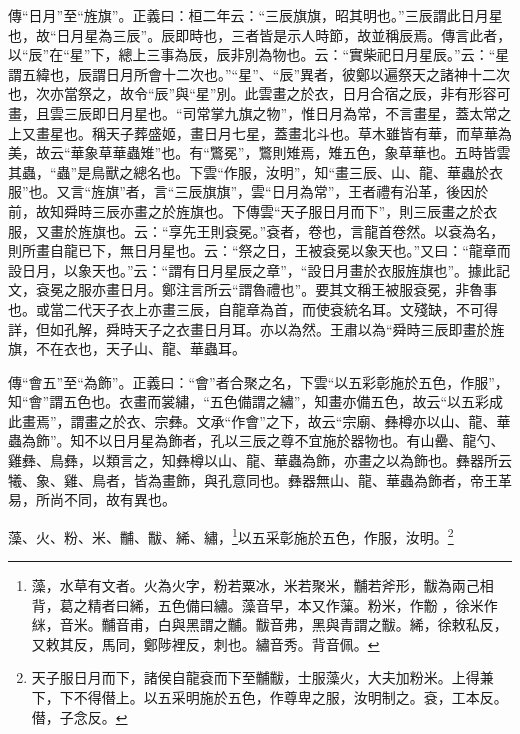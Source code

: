 {\noindent\zhuan{}\fzbyks 傳“日月”至“旌旗”。正義曰：桓二年云：“三辰旗旗，昭其明也。”三辰謂此日月星也，故“日月星為三辰”。辰即時也，三者皆是示人時節，故並稱辰焉。傳言此者，以“辰”在“星”下，總上三事為辰，辰非別為物也。云：“實柴祀日月星辰。”云：“星謂五緯也，辰謂日月所會十二次也。”“星”、“辰”異者，彼鄭以遍祭天之諸神十二次也，次亦當祭之，故令“辰”與“星”別。此雲畫之於衣，日月合宿之辰，非有形容可畫，且雲三辰即日月星也。“司常掌九旗之物”，惟日月為常，不言畫星，蓋太常之上又畫星也。稱天子葬盛姬，畫日月七星，蓋畫北斗也。草木雖皆有華，而草華為美，故云“華象草華蟲雉”也。有“鷩冕”，鷩則雉焉，雉五色，象草華也。五時皆雲其蟲，“蟲”是鳥獸之總名也。下雲“作服，汝明”，知“畫三辰、山、龍、華蟲於衣服”也。又言“旌旗”者，言“三辰旗旗”，雲“日月為常”，王者禮有沿革，後因於前，故知舜時三辰亦畫之於旌旗也。下傳雲“天子服日月而下”，則三辰畫之於衣服，又畫於旌旗也。云：“享先王則袞冕。”袞者，卷也，言龍首卷然。以袞為名，則所畫自龍已下，無日月星也。云：“祭之日，王被袞冕以象天也。”又曰：“龍章而設日月，以象天也。”云：“謂有日月星辰之章”，“設日月畫於衣服旌旗也”。據此記文，袞冕之服亦畫日月。鄭注言所云“謂魯禮也”。要其文稱王被服袞冕，非魯事也。或當二代天子衣上亦畫三辰，自龍章為首，而使袞統名耳。文殘缺，不可得詳，但如孔解，舜時天子之衣畫日月耳。亦以為然。王肅以為“舜時三辰即畫於旌旗，不在衣也，天子山、龍、華蟲耳。 \par}

{\noindent\zhuan{}\fzbyks 傳“會五”至“為飾”。正義曰：“會”者合聚之名，下雲“以五彩彰施於五色，作服”，知“會”謂五色也。衣畫而裳繡，“五色備謂之繡”，知畫亦備五色，故云“以五彩成此畫焉”，謂畫之於衣、宗彝。文承“作會”之下，故云“宗廟、彝樽亦以山、龍、華蟲為飾”。知不以日月星為飾者，孔以三辰之尊不宜施於器物也。有山罍、龍勺、雞彝、鳥彝，以類言之，知彝樽以山、龍、華蟲為飾，亦畫之以為飾也。彝器所云犧、象、雞、鳥者，皆為畫飾，與孔意同也。彝器無山、龍、華蟲為飾者，帝王革易，所尚不同，故有異也。 \par}

藻、火、粉、米、黼、黻、絺、繡，\footnote{藻，水草有文者。火為火字，粉若粟冰，米若聚米，黼若斧形，黻為兩己相背，葛之精者曰絺，五色備曰繡。藻音早，本又作薻。粉米，作黺𪓋，徐米作䋛，音米。黼音甫，白與黑謂之黼。黻音弗，黑與青謂之黻。絺，徐敕私反，又敕其反，馬同，鄭陟裡反，刺也。繡音秀。背音佩。}以五采彰施於五色，作服，汝明。\footnote{天子服日月而下，諸侯自龍袞而下至黼黻，士服藻火，大夫加粉米。上得兼下，下不得僣上。以五采明施於五色，作尊卑之服，汝明制之。袞，工本反。僣，子念反。}



